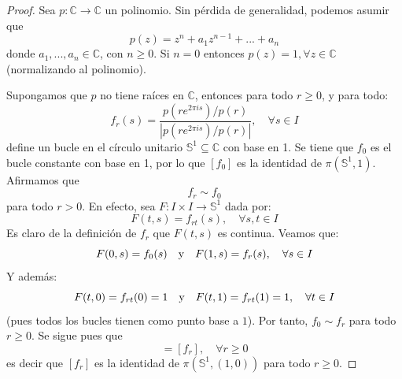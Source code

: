 \documentclass[12pt]{report}
\theoremstyle{largebreak}
\newcommand\abs[1]{\ensuremath{\left|#1\right|}}
\newcommand\cf[3]{\ensuremath{#1:#2\rightarrow#3}}
\begin{document}
    \begin{proof}
        Sea $\cf{p}{\mathbb{C}}{\mathbb{C}}$ un polinomio. Sin pérdida de generalidad, podemos asumir que
        \begin{equation*}
            p(z)=z^{ n}+a_1z^{ n-1}+...+a_n
        \end{equation*}
        donde $a_1,...,a_n\in\mathbb{C}$, con $n\geq0$. Si $n=0$ entonces $p(z)=1,\forall z\in\mathbb{C}$ (normalizando al polinomio).

        Supongamos que $p$ no tiene raíces en $\mathbb{C}$, entonces para todo $r\geq 0$, y para todo:
        \begin{equation*}
            f_r(s)=\frac{p(re^{ 2\pi is})/p(r)}{\abs{p(re^{ 2\pi is})/p(r)}},\quad\forall s\in I
        \end{equation*}
        define un bucle en el círculo unitario $\mathbb{S}^1\subseteq\mathbb{C}$ con base en 1. Se tiene que $f_0$ es el bucle constante con base en 1, por lo que $[f_0]$ es la identidad de $\pi(\mathbb{S}^1,1)$. Afirmamos que
        \begin{equation*}
            f_r\sim f_0
        \end{equation*}
        para todo $r>0$. En efecto, sea $\cf{F}{I\times I}{\mathbb{S}^1}$ dada por:
        \begin{equation*}
            F(t,s)=f_{ rt}(s),\quad\forall  s,t\in I
        \end{equation*}
        Es claro de la definición de $f_r$ que $F(t,s)$ es continua. Veamos que:
        \begin{equation*}
            F(0,s)=f_0(s)\quad\textup{y}\quad F(1,s)=f_r(s),\quad\forall s\in I
        \end{equation*}
        Y además:
        \begin{equation*}
            F(t,0)=f_{ rt}(0)=1\quad\textup{y}\quad F(t,1)=f_{ rt}(1)=1,\quad\forall t\in I
        \end{equation*}
        (pues todos los bucles tienen como punto base a $1$). Por tanto, $f_0\sim f_r$ para todo $r\geq0$. Se sigue pues que
        \begin{equation*}
            [f_0]=[f_r],\quad\forall r\geq0
        \end{equation*}
        es decir que $[f_r]$ es la identidad de $\pi(\mathbb{S}^1,(1,0))$ para todo $r\geq0$.


\end{proof}
\end{document}
